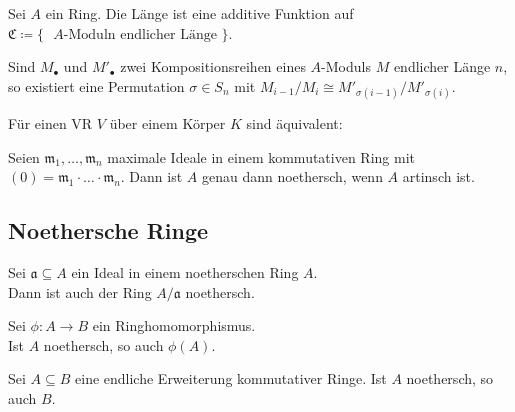 \documentclass{cheat-sheet}
\newcommand{\SC}{\mathfrak{C}} %
\newcommand{\aaa}{\mathfrak{a}}
\newcommand{\mmm}{\mathfrak{m}}
\begin{document}
\begin{prop}
  Sei $A$ ein Ring.
  Die Länge ist eine additive Funktion auf $\SC \coloneqq \{ \text{ $A$-Moduln endlicher Länge } \}$.
\end{prop}

\begin{satz}
  Sind $M_\bullet$ und $M'_\bullet$ zwei Kompositionsreihen eines $A$-Moduls $M$ endlicher Länge $n$, so existiert eine Permutation $\sigma \in S_n$ mit $M_{i-1}/M_i \cong M'_{\sigma(i-1)}/M'_{\sigma(i)}$.
\end{satz}

\begin{prop}
  Für einen VR $V$ über einem Körper $K$ sind äquivalent:
  \begin{itemize}
  \end{itemize}
\end{prop}

\begin{kor}
  Seien $\mmm_1, \ldots, \mmm_n$ maximale Ideale in einem kommutativen Ring mit $(0) = \mmm_1 \cdot \ldots \cdot \mmm_n$.
  Dann ist $A$ genau dann noethersch, wenn $A$ artinsch ist.
\end{kor}

\subsection{Noethersche Ringe}



\begin{prop}
  Sei $\aaa \subseteq A$ ein Ideal in einem noetherschen Ring $A$. \\
  Dann ist auch der Ring $A / \aaa$ noethersch.
\end{prop}

\begin{kor}
  Sei $\phi : A \to B$ ein Ringhomomorphismus. \\
  Ist $A$ noethersch, so auch $\phi(A)$.
\end{kor}

\begin{prop}
  Sei $A \subseteq B$ eine endliche Erweiterung kommutativer Ringe.
  Ist $A$ noethersch, so auch $B$.
\end{prop}
\end{document}
